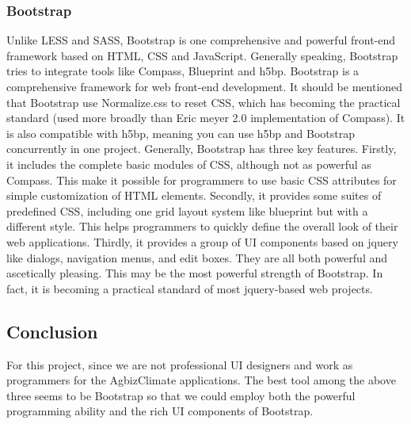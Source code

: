 \documentclass[letterpaper,10pt]{article}
\begin{document}
		\subsubsection{Bootstrap}
    Unlike LESS and SASS, Bootstrap is one comprehensive and powerful front-end framework based on HTML, CSS and JavaScript. Generally speaking, Bootstrap tries to integrate tools like Compass, Blueprint and h5bp. Bootstrap is a comprehensive framework for web front-end development. It should be mentioned that Bootstrap use Normalize.css to reset CSS, which has becoming the practical standard (used more broadly than Eric meyer 2.0 implementation of Compass). It is also compatible with h5bp, meaning you can use h5bp and Bootstrap concurrently in one project. Generally, Bootstrap has three key features. Firstly, it includes the complete basic modules of CSS, although not as powerful as Compass. This make it possible for programmers to use basic CSS attributes for simple customization of HTML elements. Secondly, it provides some suites of predefined CSS, including one grid layout system like blueprint but with a different style. This helps programmers to quickly define the overall look of their web applications. Thirdly, it provides a group of UI components based on jquery like dialogs, navigation menus, and edit boxes. They are all both powerful and ascetically pleasing. This may be the most powerful strength of Bootstrap. In fact, it is becoming a practical standard of most jquery-based web projects.

	\subsection{Conclusion}
      For this project, since we are not professional UI designers and work as programmers for the AgbizClimate applications. The best tool among the above three seems to be Bootstrap so that we could employ both the powerful programming ability and the rich UI components of Bootstrap. 
\end{document}
